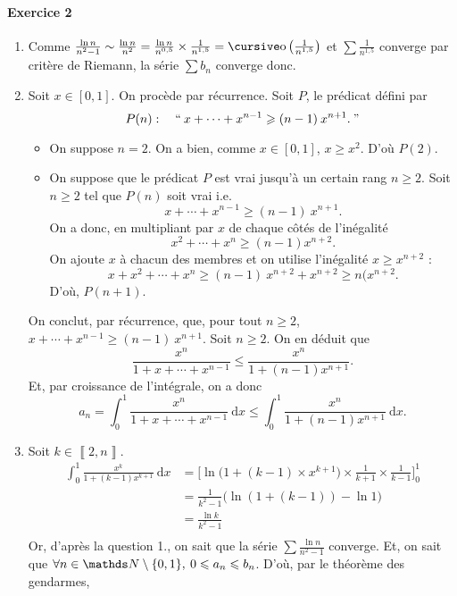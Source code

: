 \documentclass[a4paper]{article}
\begin{document}
	\paragraph{Exercice 2}
	\begin{enumerate}
		\item Comme $\frac{\ln n}{n^2 - 1} \sim \frac{\ln n }{n^2} = \frac{\ln n}{n^{0{,}5}} \times \frac{1}{n^{1{,}5}} = \po\left( \frac{1}{n^{1{,}5}} \right)$\/ et $\sum \frac{1}{n^{1{,}5}}$\/ converge par critère de {\sc Riemann}, la série $\sum b_n$\/ converge donc.
		\item Soit $x \in {[0,1]}$. On procède par récurrence. Soit $P$, le prédicat défini par \[
				P(n) : \quad``\:x + \cdots + x^{n-1} \ge (n-1)\:x^{n+1}.\:"
			\]
			\begin{itemize}
				\item On suppose $n = 2$. On a bien, comme $x \in [0,1]$, $x \ge x^2$. D'où $P(2)$.
				\item On suppose que le prédicat $P$\/ est vrai jusqu'à un certain rang $n \ge 2$. Soit $n \ge 2$\/ tel que $P(n)$\/ soit vrai i.e.\ \[
						x + \cdots + x^{n-1} \ge (n-1)\:x^{n+1}
					.\]
					On a donc, en multipliant par $x$\/ de chaque côtés de l'inégalité \[
						x^2 + \cdots + x^{n} \ge (n-1)x^{n+2}
					.\]
					On ajoute $x$\/ à chacun des membres et on utilise l'inégalité $x \ge x^{n+2}$\/ : \[
						x + x^2 + \cdots + x^n \ge (n-1)\:x^{n+2} + x^{n+2} \ge n(x^{n+2}.
					\] D'où, $P(n+1)$.
			\end{itemize}
			On conclut, par récurrence, que, pour tout $n \ge 2$, $x + \cdots + x^{n-1} \ge (n-1)\:x^{n+1}$. Soit $n \ge 2$. On en déduit que \[
				\frac{x^n}{1 + x + \cdots + x^{n-1}} \le \frac{x^n}{1 + (n-1)x^{n+1}}
			.\] Et, par croissance de l'intégrale, on a donc \[
				\boxed{a_n = \int_{0}^{1} \frac{x^n}{1 + x + \cdots + x^{n-1}}~\mathrm{d}x \le \int_{0}^{1} \frac{x^n}{1 + (n-1)x^{n+1}}~\mathrm{d}x.}
			\]
		\item Soit $k \in \left\llbracket 2,n \right\rrbracket$.
			\begin{align*}
				\int_{0}^{1} \frac{x^k}{1 + (k-1)x^{k+1}}~\mathrm{d}x &= \bigg[\ln\big(1 + (k-1) \times x^{k+1}\big) \times  \frac{1}{k+1} \times \frac{1}{k-1} \bigg]_0^1 \\
				&= \frac{1}{k^2 - 1} \Big(\ln(1 + (k-1)) - \ln 1\Big) \\
				&= \frac{\ln k}{k^2 - 1} \\
			\end{align*}
			Or, d'après la question 1., on sait que la série $\sum \frac{\ln n}{n^2 - 1}$\/ converge. Et, on sait que $\forall n \in \N\setminus \{0,1\},\: 0 \le a_n \le b_n$. D'où, par le théorème des gendarmes, 
	\end{enumerate}
	\bigskip
	\bigskip
\end{document}
